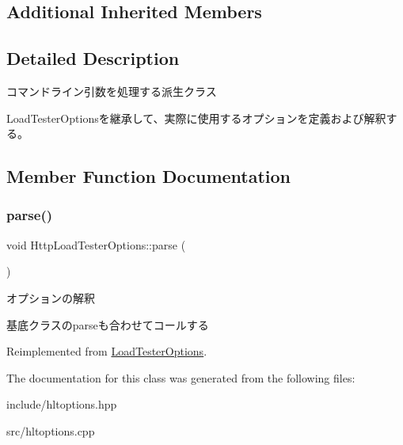 \subsection*{Additional Inherited Members}


\subsection{Detailed Description}
コマンドライン引数を処理する派生クラス 

Load\+Tester\+Optionsを継承して、実際に使用するオプションを定義および解釈する。 

\subsection{Member Function Documentation}
\mbox{\label{class_http_load_tester_options_a5b5ce6c59de007c423d7da2481622b09}} 
\subsubsection{\texorpdfstring{parse()}{parse()}}
{\footnotesize\ttfamily void Http\+Load\+Tester\+Options\+::parse (\begin{DoxyParamCaption}{ }\end{DoxyParamCaption})\hspace{0.3cm}{\ttfamily [virtual]}}



オプションの解釈 

基底クラスのparseも合わせてコールする 

Reimplemented from \mbox{\hyperlink{class_load_tester_options_ae444c5c2f49cf71d6c63c2eaaf577f62}{Load\+Tester\+Options}}.



The documentation for this class was generated from the following files\+:\begin{DoxyCompactItemize}
\item 
include/hltoptions.\+hpp\item 
src/hltoptions.\+cpp\end{DoxyCompactItemize}
